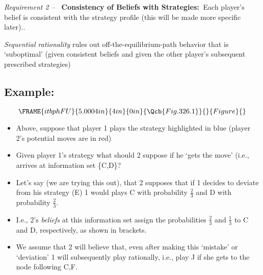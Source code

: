 \documentclass{article}
\begin{document}
\bigskip

\textit{Requirement 2 -- }\textbf{\ Consistency of Beliefs with Strategies: }%
$\ $Each player's belief is consistent with the strategy profile (this will
be made more specific later)..

\bigskip

\textit{Sequential rationality} rules out off-the-equilibrium-path behavior
that is `suboptimal' (given consistent beliefs and given the other player's
subsequent prescribed strategies)

\bigskip

\subsection{Example:}

\begin{equation}
\FRAME{itbphFU}{5.0004in}{4in}{0in}{\Qcb{Fig. 326.1}}{}{Figure}{\special%
{language "Scientific Word";type "GRAPHIC";maintain-aspect-ratio
TRUE;display "USEDEF";valid_file "T";width 5.0004in;height 4in;depth
0in;original-width 5.3599in;original-height 4.4317in;cropleft "0";croptop
"1";cropright "1";cropbottom "0";tempfilename
'JSHANV32.wmf';tempfile-properties "XPR";}}
\end{equation}

\begin{itemize}
\item Above, suppose that player 1 plays the strategy highlighted in blue
(player 2's potential moves are in red)

\item Given player 1's strategy what should 2 suppose if he `gets the move'
(i.e., arrives at information set \{C,D\}?

\item Let's say (we are trying this out), that 2 supposes that if 1 decides
to deviate from his strategy (E) 1 would plays C with probability $\frac{2}{3%
}$ and D with probability $\frac{2}{3}$.

\item I.e., 2's \textit{beliefs} at this information set assign the
probabilities $\frac{2}{3}$ and $\frac{1}{3}$ to C and D, respectively, as
shown in brackets.

\item We assume that 2 will believe that, even after making this `mistake'
or `deviation' 1 will subsequently play rationally, i.e., play J if she gets
to the node following C,F.
\end{itemize}
\end{document}
